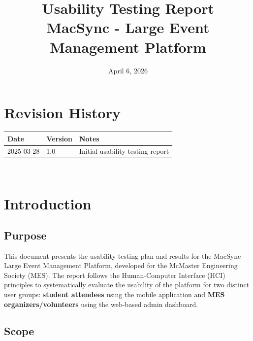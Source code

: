 \documentclass[12pt, titlepage]{article}
\begin{document}
\title{Usability Testing Report\\MacSync - Large Event Management Platform}
\author{\authname}
\date{April 6, 2026}


\maketitle




\section*{Revision History}


\begin{tabularx}{\textwidth}{p{3cm}p{2cm}X}
\toprule {\bf Date} & {\bf Version} & {\bf Notes}\\
\midrule
2025-03-28 & 1.0 & Initial usability testing report\\
\bottomrule
\end{tabularx}


~\\


\newpage


\tableofcontents


\newpage
{}


\section{Introduction}


\subsection{Purpose}


This document presents the usability testing plan and results for the MacSync Large Event Management Platform, developed for the McMaster Engineering Society (MES). The report follows the Human-Computer Interface (HCI) principles to systematically evaluate the usability of the platform for two distinct user groups: \textbf{student attendees} using the mobile application and \textbf{MES organizers/volunteers} using the web-based admin dashboard.


\subsection{Scope}
\end{document}
